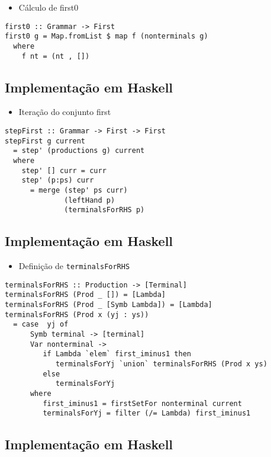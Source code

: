 \documentclass[11pt]{article}
\begin{document}
\begin{itemize}
\item Cálculo de first0
\end{itemize}

\begin{verbatim}
first0 :: Grammar -> First
first0 g = Map.fromList $ map f (nonterminals g)
  where
    f nt = (nt , [])
\end{verbatim}
\subsection*{Implementação em Haskell}
\label{sec:org92abba2}

\begin{itemize}
\item Iteração do conjunto first
\end{itemize}

\begin{verbatim}
stepFirst :: Grammar -> First -> First
stepFirst g current
  = step' (productions g) current
  where
    step' [] curr = curr
    step' (p:ps) curr
      = merge (step' ps curr)
              (leftHand p)
              (terminalsForRHS p)
\end{verbatim}
\subsection*{Implementação em Haskell}
\label{sec:org0a9d1a4}

\begin{itemize}
\item Definição de \texttt{terminalsForRHS}
\end{itemize}

\begin{verbatim}
terminalsForRHS :: Production -> [Terminal]
terminalsForRHS (Prod _ []) = [Lambda]
terminalsForRHS (Prod _ [Symb Lambda]) = [Lambda]
terminalsForRHS (Prod x (yj : ys))
  = case  yj of
      Symb terminal -> [terminal]
      Var nonterminal ->
         if Lambda `elem` first_iminus1 then
            terminalsForYj `union` terminalsForRHS (Prod x ys)
         else
            terminalsForYj
      where
         first_iminus1 = firstSetFor nonterminal current
         terminalsForYj = filter (/= Lambda) first_iminus1
\end{verbatim}
\subsection*{Implementação em Haskell}
\label{sec:org4e7fba5}
\end{document}
